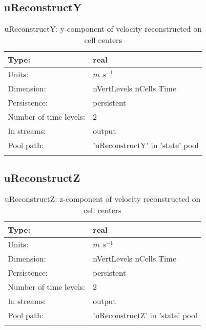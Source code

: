\subsection[uReconstructY]{uReconstructY}
\label{subsec:var_sec_state_uReconstructY}
\begin{center}
\begin{longtable}{| p{2.0in} | p{4.0in} |}
        \hline 
        Type: & real \\
        \hline 
        Units: & $m$ $s^{-1}$ \\
        \hline 
        Dimension: & nVertLevels nCells Time \\
        \hline 
        Persistence: & persistent \\
        \hline 
        Number of time levels: & 2 \\
        \hline 
		 In streams: &  output \\
        \hline 
            Pool path: & 'uReconstructY' in 'state' pool
 \\
		 \hline 
    \caption{uReconstructY: y-component of velocity reconstructed on cell centers}
\end{longtable}
\end{center}
\subsection[uReconstructZ]{uReconstructZ}
\label{subsec:var_sec_state_uReconstructZ}
\begin{center}
\begin{longtable}{| p{2.0in} | p{4.0in} |}
        \hline 
        Type: & real \\
        \hline 
        Units: & $m$ $s^{-1}$ \\
        \hline 
        Dimension: & nVertLevels nCells Time \\
        \hline 
        Persistence: & persistent \\
        \hline 
        Number of time levels: & 2 \\
        \hline 
		 In streams: &  output \\
        \hline 
            Pool path: & 'uReconstructZ' in 'state' pool
 \\
		 \hline 
    \caption{uReconstructZ: z-component of velocity reconstructed on cell centers}
\end{longtable}
\end{center}
